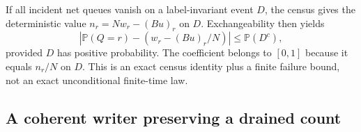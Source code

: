 \documentclass[11pt,a4paper]{article}
\theoremstyle{definition}
\theoremstyle{remark}\newtheorem{remark}[theorem]{Remark}
\begin{document}
If all incident net queues vanish on a label-invariant event $D$, the census gives the deterministic value $n_r=Nw_r-(Bu)_r$ on $D$. Exchangeability then yields
\begin{equation}\label{pil:drainedlaw}
 \left|\mathbb P(Q=r)-\left(w_r-(Bu)_r/N\right)\right|\le\mathbb P(D^c),
\end{equation}
provided $D$ has positive probability. The coefficient belongs to $[0,1]$ because it equals $n_r/N$ on $D$. This is an exact census identity plus a finite failure bound, not an exact unconditional finite-time law.

\subsection{A coherent writer preserving a drained count}
\end{document}
